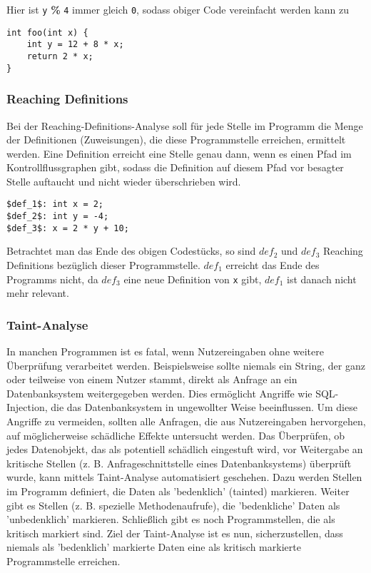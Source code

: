 Hier ist \lstinline|y| \textbf{\%} \lstinline|4| immer gleich \lstinline{0}, sodass obiger Code vereinfacht werden kann zu

\par

\begin{lstlisting}[frame=single, captionpos=b, caption=Mittels Constant-Bits-Analyse optimierte Version von Listing 4]
int foo(int x) {
	int y = 12 + 8 * x;
	return 2 * x;
} 
\end{lstlisting}

\subsubsection{Reaching Definitions}
Bei der Reaching-Definitions-Analyse soll für jede Stelle im Programm die Menge der Definitionen (Zuweisungen), die diese Programmstelle erreichen, ermittelt werden.
Eine Definition erreicht eine Stelle genau dann, wenn es einen Pfad im Kontrollflussgraphen gibt, sodass die Definition auf diesem Pfad vor besagter Stelle auftaucht und nicht wieder überschrieben wird.

\par

\begin{lstlisting}[frame=single, captionpos=b, caption=Beispielcode für Reaching-Definitions-Analyse]
$def_1$: int x = 2;
$def_2$: int y = -4;
$def_3$: x = 2 * y + 10; 
\end{lstlisting}

\par

Betrachtet man das Ende des obigen Codestücks, so sind $def_2$ und $def_3$ Reaching Definitions bezüglich dieser Programmstelle.
$def_1$ erreicht das Ende des Programms nicht, da $def_3$ eine neue Definition von \lstinline{x} gibt, $def_1$ ist danach nicht mehr relevant.

\subsubsection{Taint-Analyse}
In manchen Programmen ist es fatal, wenn Nutzereingaben ohne weitere Überprüfung verarbeitet werden. 
Beispielsweise sollte niemals ein String, der ganz oder teilweise von einem Nutzer stammt, direkt als Anfrage an ein Datenbanksystem weitergegeben werden.
Dies ermöglicht Angriffe wie SQL-Injection, die das Datenbanksystem in ungewollter Weise beeinflussen.
Um diese Angriffe zu vermeiden, sollten alle Anfragen, die aus Nutzereingaben hervorgehen, auf möglicherweise schädliche Effekte untersucht werden.
Das Überprüfen, ob jedes Datenobjekt, das als potentiell schädlich eingestuft wird, vor Weitergabe an kritische Stellen (z. B. Anfrageschnittstelle eines Datenbanksystems) überprüft wurde, kann mittels Taint-Analyse automatisiert geschehen.
Dazu werden Stellen im Programm definiert, die Daten als 'bedenklich' (tainted) markieren.
Weiter gibt es Stellen (z. B. spezielle Methodenaufrufe), die 'bedenkliche' Daten als 'unbedenklich' markieren.
Schließlich gibt es noch Programmstellen, die als kritisch markiert sind.
Ziel der Taint-Analyse ist es nun, sicherzustellen, dass niemals als 'bedenklich' markierte Daten eine als kritisch markierte Programmstelle erreichen.

